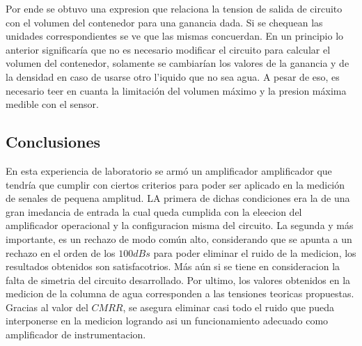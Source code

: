 Por ende se obtuvo una expresion que relaciona la tension de salida de circuito con el volumen del contenedor para una ganancia dada. Si se chequean las unidades correspondientes se ve que las mismas concuerdan. En un principio lo anterior significar\'ia que no es necesario modificar el circuito para calcular el volumen del contenedor, solamente se cambiar\'ian los valores de la ganancia y de la densidad en caso de usarse otro l'iquido que no sea agua. A pesar de eso, es necesario teer en cuanta la limitaci\'on del volumen m\'aximo y la presion m\'axima medible con el sensor.


\subsection{Conclusiones}

En esta experiencia de laboratorio se arm\'o un amplificador amplificador que tendr\'ia que cumplir con ciertos criterios para poder ser aplicado en la medici\'on de senales de pequena amplitud. LA primera de dichas condiciones era la de una gran imedancia de entrada la cual queda cumplida con la eleecion del amplificador operacional y la configuracion misma del circuito. La segunda y m\'as importante, es un rechazo de modo com\'un alto, considerando que se apunta a un rechazo en el orden de los $100dBs$ para poder eliminar el ruido de la medicion, los resultados obtenidos son satisfacotrios. M\'as a\'un si se tiene en consideracion la falta de simetria del circuito desarrollado. Por ultimo, los valores obtenidos en la medicion de la columna de agua corresponden a las tensiones teoricas propuestas. Gracias al valor del $CMRR$, se asegura eliminar casi todo el ruido que pueda interponerse en la medicion logrando asi un funcionamiento adecuado como amplificador de instrumentacion.

